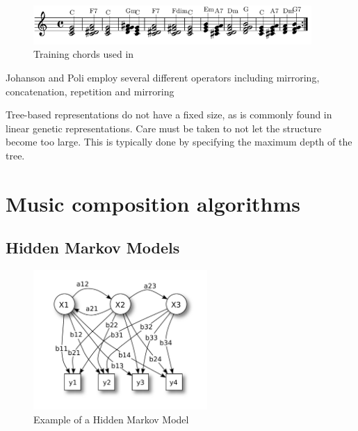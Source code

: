 \begin{figure}
\centerline{\includegraphics[width=400px]{../images/eck_chords_training.png}}
\caption{Training chords used in \cite{Eck2002}}
\label{ims:eckchords}
\end{figure}

Johanson and Poli employ several different operators including mirroring, concatenation, repetition and mirroring \cite{Johanson1998}

Tree-based representations do not have a fixed size, as is commonly found in linear genetic representations. Care must be taken to not let the structure become too large. This is typically done by specifying the maximum depth of the tree.


\chapter{Music composition algorithms} \label{chap:comp_algo}

\section{Hidden Markov Models} \label{sec:hmm_backround}

\begin{figure}[ht!]
\center
\includegraphics[width=250px]{../images/HiddenMarkovModel.pdf}
\caption{Example of a Hidden Markov Model}
\label{ims:hmm_example}
\end{figure}

